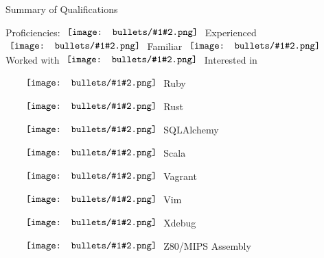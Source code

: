 \documentclass[letterpaper,10pt]{article}
\newcommand{\gbullet}[2][circle]{
  \vcenter{\hbox{
    \texttt{[image: bullets/\#1\#2.png]}
    \vspace{2pt}
  }}
}
\begin{document}
\begin{res_section}{Summary of Qualifications}
\begin{res_content}{Proficiencies: \small \hfill $\gbullet{4}$ Experienced $\gbullet{3}$ Familiar $\gbullet{2}$ Worked with $\gbullet{1}$ Interested in}
\begin{multicols}{6}
\begin{itemize}[labelsep=0em]
    \item[$\gbullet{2}$] Ruby
    \item[$\gbullet{1}$] Rust
    \item[$\gbullet{3}$] SQLAlchemy
    \item[$\gbullet{1}$] Scala
    \item[$\gbullet{4}$] Vagrant
    \item[$\gbullet{4}$] Vim
    \item[$\gbullet{4}$] Xdebug
    \item[$\gbullet{2}$] Z80/MIPS \newline Assembly
  \end{itemize}
  \end{multicols}
\end{res_content}
\end{res_section}
\end{document}
